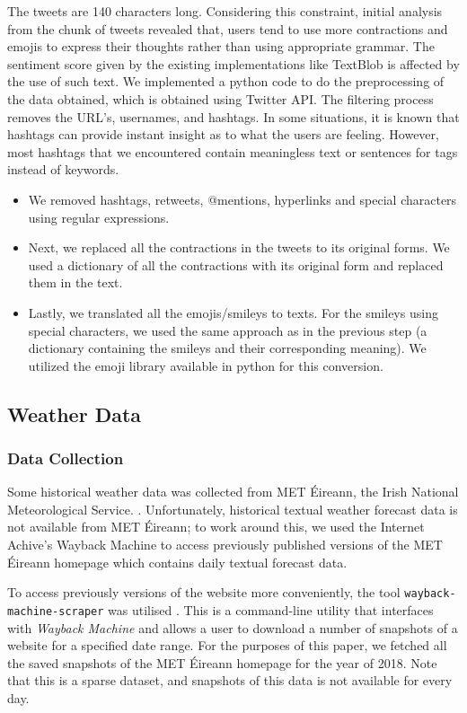 \documentclass[a4paper,10pt]{article}
\begin{document}
The tweets are 140 characters long. Considering this constraint, initial analysis from the chunk of tweets revealed that, users tend to use more contractions and emojis to express their thoughts rather than using appropriate grammar. The sentiment score given by the existing implementations like TextBlob is affected by the use of such text. We implemented a python code to do the preprocessing of the data obtained, which is obtained using Twitter API. The filtering process removes the URL’s, usernames, and hashtags. In some situations, it is known that hashtags can provide instant insight as to what the users are feeling. However, most hashtags that we encountered contain meaningless text or sentences for tags instead of keywords.

\begin{itemize}
	\item{
		We removed hashtags, retweets, @mentions, hyperlinks and special characters using regular expressions.
	}
	\item{
		Next, we replaced all the contractions in the tweets to its original forms. We used a dictionary of all the contractions with its original form and replaced them in the text.
	}
	\item{
		Lastly, we translated all the emojis/smileys to texts. For the smileys using special characters, we used the same approach as in the previous step (a dictionary containing the smileys and their corresponding meaning). We utilized the emoji library available in python for this conversion.
	}
\end{itemize}


\subsection{Weather Data}

\subsubsection{Data Collection}

Some historical weather data was collected from MET \'{E}ireann, the Irish National Meteorological Service. . Unfortunately, historical textual weather forecast data is not available from MET \'{E}ireann; to work around this, we used the Internet Achive's Wayback Machine  to access previously published versions of the MET \'{E}ireann homepage which contains daily textual forecast data.

To access previously versions of the website more conveniently, the tool \texttt{wayback-machine-scraper} was utilised . This is a command-line utility that interfaces with \textit{Wayback Machine} and allows a user to download a number of snapshots of a website for a specified date range. For the purposes of this paper, we fetched all the saved snapshots of the MET \'{E}ireann homepage for the year of 2018. Note that this is a sparse dataset, and snapshots of this data is not available for every day.
\end{document}

